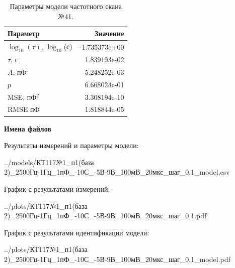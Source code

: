 \begin{table}[!ht]
    \centering
    \caption{Параметры модели частотного скана №41.}
    \begin{tabular}{|l|r|}
        \hline
        Параметр                                       & Значение                  \\ \hline
        $\log_{10}(\tau)$, $\log_{10}$(с)              & -1.735373e+00             \\ \hline
        $\tau$, с                                      & 1.839193e-02              \\ \hline
        $A$, пФ                                        & -5.248252e-03             \\ \hline
        $p$                                            & 6.668024e-01              \\ \hline
        MSE, пФ$^2$                                    & 3.308194e-10              \\ \hline
        RMSE пФ                                        & 1.818844e-05              \\ \hline
    \end{tabular}
    \label{table:frequency_scan_model_41}
\end{table}

\textbf{Имена файлов}

Результаты измерений и параметры модели:

\scriptsize../models/КТ117№1\_п1(база 2)\_2500Гц-1Гц\_1пФ\_-10С\_-5В-9В\_100мВ\_20мкс\_шаг\_0,1\_model.csv
\normalsize

График с результатами измерений:

\scriptsize../plots/КТ117№1\_п1(база 2)\_2500Гц-1Гц\_1пФ\_-10С\_-5В-9В\_100мВ\_20мкс\_шаг\_0,1.pdf
\normalsize

График с результатами идентификации модели:

\scriptsize../plots/КТ117№1\_п1(база 2)\_2500Гц-1Гц\_1пФ\_-10С\_-5В-9В\_100мВ\_20мкс\_шаг\_0,1\_model.pdf
\normalsize

